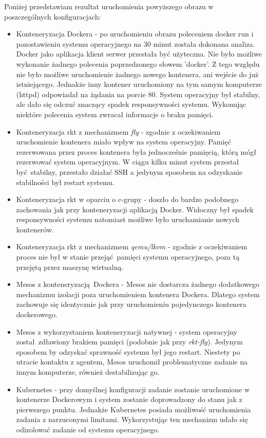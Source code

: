 \documentclass[10pt,a4paper,titlepage,twoside]{report}
\begin{document}
Poniżej przedstawiam rezultat uruchomienia powyższego obrazu w poszczególnych konfiguracjach:
\begin{itemize}
\item Konteneryzacja Dockera - po uruchomieniu obrazu poleceniem docker run i pozostawieniu systemu operacyjnego na 30 minut została dokonana analiza. Docker jako aplikacja klient serwer przestała być użyteczna. Nie było możliwe wykonanie żadnego polecenia poprzedzonego słowem 'docker'. Z tego względu nie było możliwe uruchomienie żadnego nowego kontenera, ani wejście do już istniejącego. Jednakże inny kontener uruchomiony na tym samym komputerze (httpd) odpowiadał na żądania na porcie 80. System operacyjny był stabilny, ale dało się odczuć znaczący spadek responsywności systemu. Wykonując niektóre polecenia system zwracał informacje o braku pamięci.
\item Konteneryzacja rkt z mechanizmem \textit{fly} - zgodnie z oczekiwaniem uruchomienie kontenera miało wpływ na system operacyjny. Pamięć rezerwowana przez proces kontenera była jednocześnie pamięcią, którą mógł rezerwować system operacyjnym. W ciągu kilku minut system przestał być stabilny, przestało działać SSH a jedynym sposobem na odzyskanie stabilności był restart systemu.
\item Konteneryzacja rkt w oparciu o c-grupy - doszło do bardzo podobnego zachowania jak przy konteneryzacji aplikacją Docker. Widoczny był spadek responsywności systemu natomiast możliwe było uruchamianie nowych kontenerów.
\item Konteneryzacja rkt z mechanizmem \textit{qemu/lkvm} - zgodnie z oczekiwaniem proces nie był w stanie przejąć pamięci systemu operacyjnego, poza tą przejętą przez maszynę wirtualną.
\item Mesos z konteneryzacją Dockera - Mesos nie dostarcza żadnego dodatkowego mechanizmu izolacji poza uruchomieniem kontenera Dockera. Dlatego system zachowuje się identycznie jak przy uruchomieniu pojedynczego kontenera dockerowego.
\item Mesos z wykorzystaniem konteneryzacji natywnej - system operacyjny został zdławiony brakiem pamięci (podobnie jak przy \textit{rkt-fly}). Jedynym sposobem by odzyskać sprawność systemu był jego restart. Niestety po utracie kontaktu z agentem, Mesos uruchomił problematyczne zadanie na innym komputerze, również destabilizując go.
\item Kubernetes - przy domyślnej konfiguracji zadanie zostanie uruchomione w kontenerze Dockerowym i system zostanie doprowadzony do stanu jak z pierwszego punktu. Jednakże Kubernetes posiada możliwość uruchomienia zadania z narzuconymi limitami. Wykorzystując ten mechanizm udało się odizolować zadanie od systemu operacyjnego. 
\end{itemize}
\end{document}
